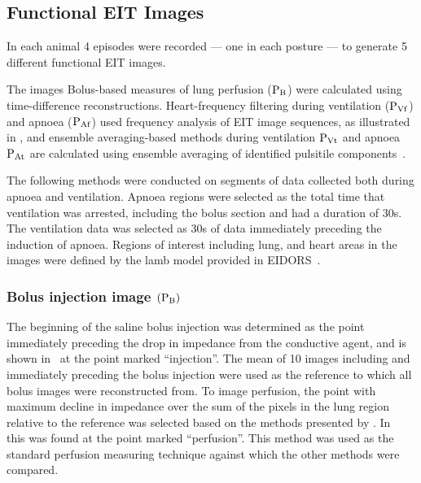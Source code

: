 \subsection{Functional EIT Images}

In each animal 4 episodes were recorded --- one in each posture --- to generate 5
different functional EIT images. 

The images
Bolus-based measures of lung perfusion (${\rm P_{B}}$) were
calculated using time-difference
reconstructions. Heart-frequency filtering during ventilation (${\rm P_{Vf}}$) and
apnoea (${\rm P_{Af}}$) used
frequency analysis of EIT image sequences, as 
illustrated in , and ensemble averaging-based methods during ventilation
${\rm P_{Vt}}$ and apnoea ${\rm P_{At}}$ are 
calculated using ensemble averaging of identified pulsitile components~.

The following methods were conducted on segments of data collected both during apnoea and ventilation. 
Apnoea regions were selected as the total time that ventilation was arrested, including the bolus section
and had a duration of 30s. The ventilation data was selected as 30s of data immediately preceding the 
induction of apnoea.
Regions of interest including lung, and heart areas in the images were defined by the lamb model
provided in EIDORS~\parencite{Adler2017b}.

\subsubsection{Bolus injection image $({\rm P_{B}})$}

The beginning of the saline bolus injection was determined as the point
immediately preceding the drop in impedance from the conductive agent, and is
shown in~ at the point marked ``injection''.
The mean of 10 images including and immediately preceding the bolus injection were used 
as the reference to which all bolus images were reconstructed from. 
To image perfusion, the point with maximum decline in impedance over 
the sum of the pixels in the lung region relative to the reference was selected based on the methods 
presented by .
In~ this was found at the point marked ``perfusion''. 
This method was used as the standard perfusion 
measuring technique
against which the other methods were compared.

